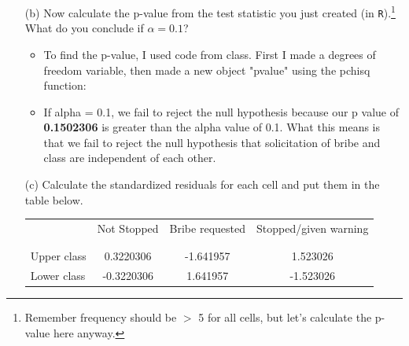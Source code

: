 \documentclass[12pt,letterpaper]{article}
\begin{document}
\begin{enumerate}
	\item [(b)]
	Now calculate the p-value from the test statistic you just created (in \texttt{R}).\footnote{Remember frequency should be $>$ 5 for all cells, but let's calculate the p-value here anyway.}  What do you conclude if $\alpha = 0.1$?\\
	
		\begin{itemize}
			\item To find the p-value, I used code from class. First I made a degrees of freedom variable, then made a new object "pvalue" using the pchisq function:
				
				
			\item If alpha = 0.1, we fail to reject the null hypothesis because our p value of \textbf{0.1502306} is greater than the alpha value of 0.1. What this means is that we fail to reject the null hypothesis that solicitation of bribe and class are independent of each other.
		\end{itemize}
	  	
	
	\newpage
	\item [(c)] Calculate the standardized residuals for each cell and put them in the table below.
	\vspace{1cm}
	
	\begin{table}[h]
		\centering
			\begin{tabular} {l | c c c }
			& Not Stopped & Bribe requested & Stopped/given warning \\
			\\[-1.8ex] 
			\hline \\[-1.8ex]
			Upper class & 0.3220306 & -1.641957  & 1.523026 \\
			Lower class & -0.3220306 & 1.641957 & -1.523026 \\
			\hline
			\end{tabular}
	\end{table}
	

\end{enumerate}
\end{document}
